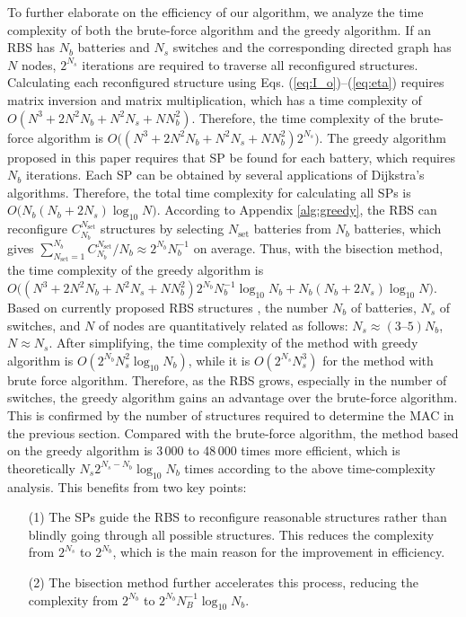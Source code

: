 \documentclass{article}
\begin{document}
To further elaborate on the efficiency of our algorithm, we analyze the time complexity of both the brute-force algorithm and the greedy algorithm.
If an RBS has $N_b$ batteries and $N_s$ switches and the corresponding directed graph has $N$ nodes,  $2^{N_s}$ iterations are required to traverse all reconfigured structures.
Calculating each reconfigured structure using Eqs. (\ref{eq:I_o})--(\ref{eq:eta}) requires matrix inversion and matrix multiplication, which has a time complexity of $O(N^3+2N^2N_b+N^2N_s+NN^2_b)$.
Therefore, the time complexity of the brute-force algorithm is $O\bm((N^3+2N^2N_b+N^2N_s+NN^2_b)2^{N_s}\bm)$.
The greedy algorithm proposed in this paper requires  that SP be found for each battery, which requires $N_b$ iterations.
Each SP can be obtained by several applications of Dijkstra's algorithms.
Therefore, the total time complexity for calculating all SPs is $O\bm(N_b(N_b+2N_s)\log_{10} N\bm)$.
According to  Appendix \ref{alg:greedy}, the RBS can reconfigure $C^{N_{\text{set}}}_{N_b}$ structures by selecting $N_{\text{set}}$ batteries from $N_b$ batteries, which gives $\sum^{N_b}_{N_{\text{set}}=1}C^{N_{\text{set}}}_{N_b}/N_b \approx 2^{N_b} N_b^{-1}$ on average.
Thus, with the bisection method, the time complexity of the greedy algorithm is $O\bm((N^3+2N^2N_b+N^2N_s+NN^2_b) 2^{N_b} N_b^{-1} \log_{10} N_b+N_b(N_b+2N_s)\log_{10} N\bm)$.
Based on currently proposed RBS structures \cite{ciNovelDesignAdaptive2007,alahmadBatterySwitchArray2008,kimDependableEfficientScalable2010b,kimBalancedReconfigurationStorage2011a,taesickimSeriesconnectedSelfreconfigurableMulticell2012a,6843711}, the number $N_b$ of batteries, $N_s$ of switches, and $N$ of nodes are quantitatively related as follows: $N_s \approx (3\text{--} 5)N_b$, $N \approx N_s$. 
After simplifying, the time complexity of the method with greedy algorithm is $O(2^{N_b}N_s^2\log_{10} N_b)$, while it is $O(2^{N_s}N_s^3)$ for the method with brute force algorithm.
Therefore, as the RBS grows, especially in the number of switches, the greedy algorithm gains an advantage over the brute-force algorithm.
This is confirmed by the number of structures required to determine the MAC in the previous section. 
Compared with the brute-force algorithm, the method based on the greedy algorithm is 3\,000 to 48\,000 times more efficient, which is theoretically $N_s 2^{N_s - N_b} \log_{10} N_b$ times according to the above time-complexity analysis.
This benefits from two key points:
\begin{enumerate}
    \item[(1)] The SPs guide the RBS to reconfigure reasonable structures rather than blindly going through all possible structures. This reduces the complexity from $2^{N_s}$ to $2^{N_b}$, which is the main reason for the improvement in efficiency.
    \item[(2)] The bisection method further accelerates this process, reducing the complexity from $2^{N_b}$ to $2^{N_b} N_B^{-1} \log_{10} N_b$.
\end{enumerate}
\end{document}
